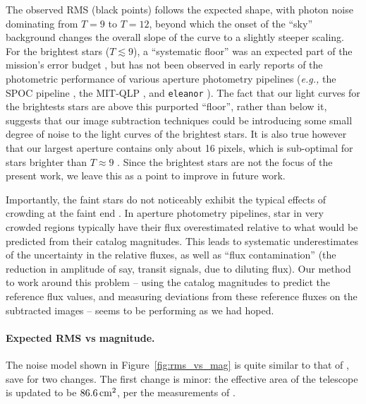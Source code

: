 \documentclass[12pt,twocolumn,tighten]{aastex62}
\begin{document}
The observed RMS (black points) follows the expected shape,
with photon noise dominating from $T=9$ to $T=12$, beyond which the
onset of the ``sky'' background changes the overall slope of the
curve to a slightly steeper scaling.
For the brightest stars ($T\lesssim 9$), a ``systematic floor'' was an
expected part of the mission's error budget \citep{ricker_transiting_2015}, 
but 
has not been observed in early
reports of the photometric performance of various aperture photometry
pipelines ({\it e.g.,} the SPOC pipeline \citealt{jenkins_spoc_2010},
the MIT-QLP \citealt{huang_tess_2018}, and \texttt{eleanor}
\citealt{feinstein_eleanor_2019}).
The fact that our light curves for the brightests stars are above this
purported ``floor'', rather than below it, suggests that our
image subtraction techniques could be introducing some small degree of
noise to the light curves of the brightest stars.
It is also true however that our largest aperture contains only about
16 pixels, which is sub-optimal for stars brighter than $T\approx9$
\citep[see][Figure~14]{Sullivan_et_al_2015}.
Since the brightest stars are not the focus of the present work, we
leave this as a point to improve in future work.

Importantly, the faint stars do not noticeably exhibit
the typical effects of crowding at the faint end 
\citep[{\it e.g.},][Figure~5]{feinstein_eleanor_2019}.
In aperture photometry pipelines, star in very crowded regions typically 
have their flux overestimated relative to what would be predicted from their
catalog magnitudes.
This leads to systematic underestimates of the uncertainty in the relative 
fluxes, as well as ``flux contamination'' (the reduction in amplitude of say, 
transit signals, due to diluting flux).
Our method to work around this problem -- using the catalog magnitudes to 
predict the reference flux values, and measuring deviations from these 
reference fluxes on the subtracted images -- seems to be performing as we had 
hoped.


\paragraph{Expected RMS vs magnitude.}

The noise model shown in Figure~\ref{fig:rms_vs_mag} is quite similar
to that of \citet{Sullivan_et_al_2015}, save for two changes.
The first change is minor: the effective area of the telescope is
updated to be $86.6\,{\rm cm}^2$, per the measurements of
\citet{vanderspek_2018}.
\end{document}
